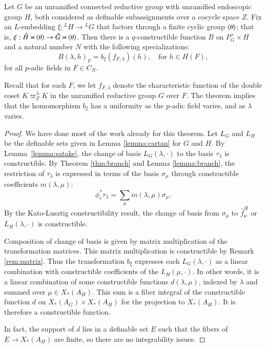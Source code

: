 \begin{theorem}\label{thm:B}
  Let $G$ be an unramified connected reductive group with unramified
  endoscopic group $H$, both considered as definable subassignments
  over a cocycle space $Z$.  Fix an $L$-embedding $\xi:{}^LH\to {}^LG$
  that factors through a finite cyclic group $\langle{\theta}\rangle$; that is,
  $\xi:\hat H\rtimes \langle{\theta}\rangle \to \hat G \rtimes \langle{\theta}\rangle$.
  Then there is a $q$-constructible function $B$ on $P^+_G\times H$
  and a natural number $N$ with the following specializations:
\[
B(\lambda,h)_F = b_\xi(f_{F,\lambda})(h),\quad \text{for } h\in H(F),
\]
for all $p$-adic fields in $F\in C_N$.  
\end{theorem}

Recall that for each $F$, we let $f_{F,\lambda}$ denote the
characteristic function of the double coset $K\varpi_F^\lambda K$ in
the unramified reductive group $G$ over $F$.  The theorem implies that
the homomorphism $b_\xi$ has a uniformity as the $p$-adic field
varies, and as $\lambda$ varies.

\begin{proof}
  We have done most of the work already for this theorem.  Let $L_G$
  and $L_H$ be the definable sets given in Lemma \ref{lemma:cartan}
  for $G$ and $H$.  By Lemma~\ref{lemma:satake}, the change of basis
  $L_G(\lambda,\cdot)$ to the basis $\tau_\lambda$ is constructible.
  By Theorem \ref{thm:branch} and Lemma \ref{lemma:branch}, the
  restriction of $\tau_\lambda$ is expressed in terms of the basis
  $\sigma_\mu$ through constructible coefficients $m(\lambda,\mu)$:
\[
\phi^*_\epsilon\tau_\lambda = \sum_{\mu} m(\lambda,\mu) \sigma_\mu.
\]
By the Kato-Lusztig constructibility result, the change of basis from
$\sigma_\mu$ to $\hat f^H_\mu$ or $L_H(\lambda,\cdot)$ is
constructible.

Composition of change of basis is given
by matrix multiplication of the transformation matrices.  This matrix
multiplication is constructible by Remark \ref{rem:matrix}.  Thus the
transformation $b_\xi$ expresses each $L_G(\lambda,\cdot)$ as a linear
combination with constructible coefficients of the $L_H(\mu,\cdot)$.
In other words, it is a linear combination of some constructible
functions $d(\lambda,\mu)$, indexed by $\lambda$ and summed over
$\mu\in X_*(A_H)$.  This sum is a fiber integral of the constructible
function $d$ on $X_*(A_G)\times X_*(A_H)$ for the projection to
$X_*(A_H)$.  It is therefore a constructible function.

In fact, the support of $d$ lies in a definable set $E$ such that the
fibers of $E\to X_*(A_H)$ are finite, so there are no integrability
issues.
\end{proof}

